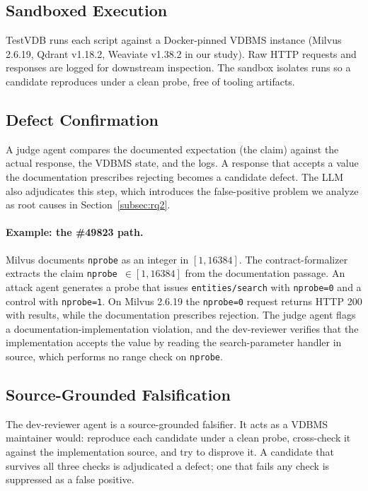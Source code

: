 \documentclass[sigconf]{acmart}
\begin{document}
\subsection{Sandboxed Execution}
\label{subsec:execution}

TestVDB runs each script against a Docker-pinned VDBMS instance (Milvus 2.6.19, Qdrant v1.18.2, Weaviate v1.38.2 in our study). Raw HTTP requests and responses are logged for downstream inspection. The sandbox isolates runs so a candidate reproduces under a clean probe, free of tooling artifacts.

\subsection{Defect Confirmation}
\label{subsec:confirmation}

A judge agent compares the documented expectation (the claim) against the actual response, the VDBMS state, and the logs. A response that accepts a value the documentation prescribes rejecting becomes a candidate defect. The LLM also adjudicates this step, which introduces the false-positive problem we analyze as root causes in Section~\ref{subsec:rq2}.

\paragraph{Example: the \#49823 path.}
Milvus documents \texttt{nprobe} as an integer in $[1, 16384]$. The contract-formalizer extracts the claim \texttt{nprobe}~$\in [1, 16384]$ from the documentation passage. An attack agent generates a probe that issues \texttt{entities/search} with \texttt{nprobe=0} and a control with \texttt{nprobe=1}. On Milvus 2.6.19 the \texttt{nprobe=0} request returns HTTP 200 with results, while the documentation prescribes rejection. The judge agent flags a documentation-implementation violation, and the dev-reviewer verifies that the implementation accepts the value by reading the search-parameter handler in source, which performs no range check on \texttt{nprobe}.

\subsection{Source-Grounded Falsification}
\label{subsec:falsification}

The dev-reviewer agent is a source-grounded falsifier. It acts as a VDBMS maintainer would: reproduce each candidate under a clean probe, cross-check it against the implementation source, and try to disprove it. A candidate that survives all three checks is adjudicated a defect; one that fails any check is suppressed as a false positive.
\end{document}
